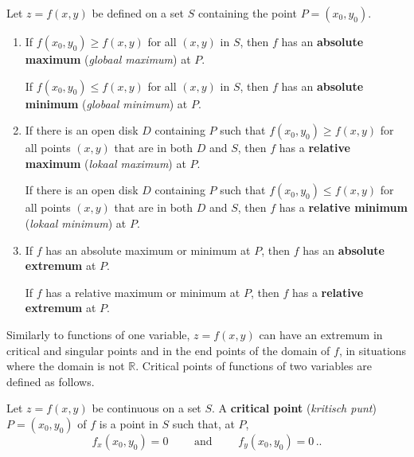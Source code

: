 \begin{definition}\label{def:multi_extrema}
Let $z=f(x,y)$ be defined on a set $S$ containing the point $P=(x_0,y_0)$.
\begin{enumerate}
	\item	If $f(x_0,y_0)\geq f(x,y)$ for all $(x,y)$ in $S$, then $f$ has an \textbf{absolute maximum} (\textit{globaal maximum}) at $P$.
	
	If $f(x_0,y_0)\leq f(x,y)$ for all $(x,y)$ in $S$, then $f$ has an \textbf{absolute minimum} (\textit{globaal minimum}) at $P$.
	
	\item If there is an open disk $D$ containing $P$ such that $f(x_0,y_0) \geq f(x,y)$ for all points $(x,y)$ that are in both $D$ and $S$, then $f$ has a \textbf{relative maximum} (\textit{lokaal maximum}) at $P$.
	
	If there is an open disk $D$ containing $P$ such that $f(x_0,y_0) \leq f(x,y)$ for all points $(x,y)$ that are in both $D$ and $S$, then $f$ has a \textbf{relative minimum} (\textit{lokaal minimum}) at $P$.
	
	
	\item		If $f$ has an absolute maximum or minimum at $P$, then $f$ has an \textbf{absolute extremum} at $P$.
	
	If $f$ has a relative maximum or minimum at $P$, then $f$ has a \textbf{relative extremum} at $P$.
	
	
\end{enumerate}
\end{definition}

 Similarly to functions of one variable, $z=f(x,y)$ can have an extremum in critical and singular points and in the end points of the domain of $f$, in situations where the domain is not $\mathbb{R}$.  Critical points of functions of two variables are defined as follows. 

\begin{definition}\label{def:multi_critical_point}
Let $z = f(x,y)$ be continuous on a set $S$. A \textbf{critical point} (\textit{kritisch punt}) $P=(x_0,y_0)$ of $f$ is a point in $S$ such that, at $P$,
$$
f_x(x_0,y_0) = 0 \qquad \text{ and } \qquad f_y(x_0,y_0) = 0\,..
$$
\end{definition}

